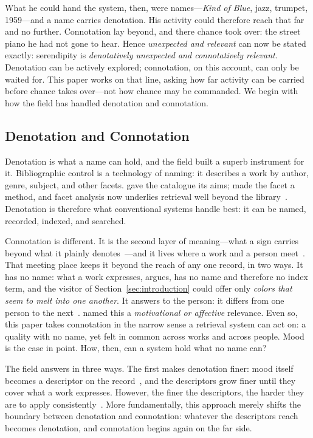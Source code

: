 What he could hand the system, then, were names---\textit{Kind of Blue}, jazz,
trumpet, 1959---and a name carries denotation. His activity could therefore
reach that far and no further. Connotation lay beyond, and there chance took
over: the street piano he had not gone to hear. Hence \textit{unexpected and
  relevant} can now be stated exactly: serendipity is \textit{denotatively
  unexpected and connotatively relevant}. Denotation can be actively explored;
connotation, on this account, can only be waited for. This paper works on that
line, asking how far activity can be carried before chance takes over---not how
chance may be commanded. We begin with how the field has handled denotation and
connotation.

\subsection{Denotation and Connotation}\label{subsec:naming}

Denotation is what a name can hold, and the field built a superb instrument for
it. Bibliographic control is a technology of naming: it describes a work by
author, genre, subject, and other facets. \citet{Cutter1876} gave the catalogue
its aims; \citet{Ranganathan1967} made the facet a method, and facet
analysis now underlies retrieval well beyond the
library~\citep{Broughton200649}. Denotation is therefore what conventional
systems handle best: it can be named, recorded, indexed, and searched.

Connotation is different. It is the second layer of meaning---what a sign
carries beyond what it plainly denotes~\citep{Rafferty2011283}---and it lives
where a work and a person meet~\citep{Rosenblatt1978}. That meeting place keeps
it beyond the reach of any one record, in two ways. It has no name: what a work
expresses, \citet{Svenonius1994600} argues, has no name and therefore no index
term, and the visitor of Section~\ref{sec:introduction} could offer only
\textit{colors that seem to melt into one another}. It answers to the person: it
differs from one person to the next~\citep{Cosijn2000533}.
\citet{Saracevic1996201} named this a \textit{motivational or affective}
relevance. Even so, this paper takes connotation in the narrow sense a retrieval
system can act on: a quality with no name, yet felt in common across works and
across people. Mood is the case in point. How, then, can a system hold what no
name can?

The field answers in three ways. The first makes denotation finer: mood itself
becomes a descriptor on the
record~\citep{Pejtersen1983230,Shatford198639,Saricks2005,Cho2023567}, and the
descriptors grow finer until they cover what a work expresses. However, the
finer the descriptors, the harder they are to apply
consistently~\citep{Saarti200249}. More fundamentally, this approach merely
shifts the boundary between denotation and connotation: whatever the descriptors
reach becomes denotation, and connotation begins again on the far side.

